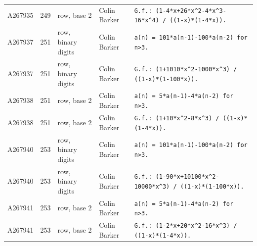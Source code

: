 \documentclass[11pt]{article}
\theoremstyle{definition}
\theoremstyle{remark}
\begin{document}
{\begin{longtable}{p{1.3cm}p{0.7cm}p{2.4cm}p{2.3cm}p{7.3cm}}
A267935 & 249 & row, base 2 & Colin Barker & \texttt{G.f.: \allowbreak{}(1-\allowbreak{}4*\allowbreak{}x+\allowbreak{}26*\allowbreak{}x\^{}2-\allowbreak{}4*\allowbreak{}x\^{}3-\allowbreak{}16*\allowbreak{}x\^{}4)\allowbreak{} \allowbreak{}/\allowbreak{} \allowbreak{}((1-\allowbreak{}x)\allowbreak{}*\allowbreak{}(1-\allowbreak{}4*\allowbreak{}x)\allowbreak{})\allowbreak{}.} \\
A267937 & 251 & row, binary digits & Colin Barker & \texttt{a(n)\allowbreak{} \allowbreak{}=\allowbreak{} \allowbreak{}101*\allowbreak{}a(n-\allowbreak{}1)\allowbreak{}-\allowbreak{}100*\allowbreak{}a(n-\allowbreak{}2)\allowbreak{} \allowbreak{}for \allowbreak{}n>3.} \\
A267937 & 251 & row, binary digits & Colin Barker & \texttt{G.f.: \allowbreak{}(1+\allowbreak{}1010*\allowbreak{}x\^{}2-\allowbreak{}1000*\allowbreak{}x\^{}3)\allowbreak{} \allowbreak{}/\allowbreak{} \allowbreak{}((1-\allowbreak{}x)\allowbreak{}*\allowbreak{}(1-\allowbreak{}100*\allowbreak{}x)\allowbreak{})\allowbreak{}.} \\
A267938 & 251 & row, base 2 & Colin Barker & \texttt{a(n)\allowbreak{} \allowbreak{}=\allowbreak{} \allowbreak{}5*\allowbreak{}a(n-\allowbreak{}1)\allowbreak{}-\allowbreak{}4*\allowbreak{}a(n-\allowbreak{}2)\allowbreak{} \allowbreak{}for \allowbreak{}n>3.} \\
A267938 & 251 & row, base 2 & Colin Barker & \texttt{G.f.: \allowbreak{}(1+\allowbreak{}10*\allowbreak{}x\^{}2-\allowbreak{}8*\allowbreak{}x\^{}3)\allowbreak{} \allowbreak{}/\allowbreak{} \allowbreak{}((1-\allowbreak{}x)\allowbreak{}*\allowbreak{}(1-\allowbreak{}4*\allowbreak{}x)\allowbreak{})\allowbreak{}.} \\
A267940 & 253 & row, binary digits & Colin Barker & \texttt{a(n)\allowbreak{} \allowbreak{}=\allowbreak{} \allowbreak{}101*\allowbreak{}a(n-\allowbreak{}1)\allowbreak{}-\allowbreak{}100*\allowbreak{}a(n-\allowbreak{}2)\allowbreak{} \allowbreak{}for \allowbreak{}n>3.} \\
A267940 & 253 & row, binary digits & Colin Barker & \texttt{G.f.: \allowbreak{}(1-\allowbreak{}90*\allowbreak{}x+\allowbreak{}10100*\allowbreak{}x\^{}2-\allowbreak{}10000*\allowbreak{}x\^{}3)\allowbreak{} \allowbreak{}/\allowbreak{} \allowbreak{}((1-\allowbreak{}x)\allowbreak{}*\allowbreak{}(1-\allowbreak{}100*\allowbreak{}x)\allowbreak{})\allowbreak{}.} \\
A267941 & 253 & row, base 2 & Colin Barker & \texttt{a(n)\allowbreak{} \allowbreak{}=\allowbreak{} \allowbreak{}5*\allowbreak{}a(n-\allowbreak{}1)\allowbreak{}-\allowbreak{}4*\allowbreak{}a(n-\allowbreak{}2)\allowbreak{} \allowbreak{}for \allowbreak{}n>3.} \\
A267941 & 253 & row, base 2 & Colin Barker & \texttt{G.f.: \allowbreak{}(1-\allowbreak{}2*\allowbreak{}x+\allowbreak{}20*\allowbreak{}x\^{}2-\allowbreak{}16*\allowbreak{}x\^{}3)\allowbreak{} \allowbreak{}/\allowbreak{} \allowbreak{}((1-\allowbreak{}x)\allowbreak{}*\allowbreak{}(1-\allowbreak{}4*\allowbreak{}x)\allowbreak{})\allowbreak{}.} \\
\bottomrule
\end{longtable}}
\end{document}
